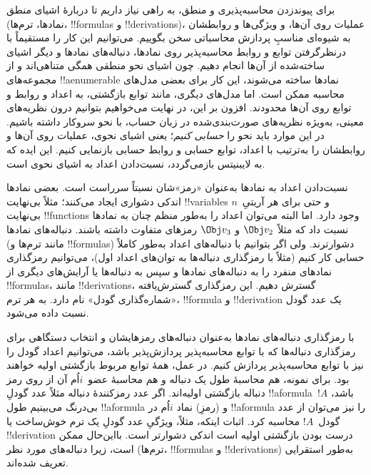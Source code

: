 \documentclass[../../../include/open-logic-section]{subfiles}
\begin{document}

برای پیوندزدن محاسبه‌پذیری و منطق، به راهی نیاز داریم تا دربارهٔ اشیای
منطق (نمادها، ترم‌ها، !!{formula}s و !!{derivation}s)، عملیات روی آن‌ها،
و ویژگی‌ها و روابطشان به شیوه‌ای مناسبِ پردازش محاسباتی سخن بگوییم.
می‌توانیم این کار را مستقیماً با درنظرگرفتن توابع و روابط محاسبه‌پذیر
روی نمادها، دنباله‌های نمادها و دیگر اشیای ساخته‌شده از آن‌ها انجام
دهیم. چون اشیای نحو منطقی همگی متناهی‌اند و از مجموعه‌های
!!a{enumerable} نمادها ساخته می‌شوند، این کار برای بعضی مدل‌های محاسبه
ممکن است. اما مدل‌های دیگری، مانند توابع بازگشتی، به اعداد و روابط و
توابع روی آن‌ها محدودند. افزون بر این، در نهایت می‌خواهیم بتوانیم
درون نظریه‌های معینی، به‌ویژه نظریه‌های صورت‌بندی‌شده در زبان حساب،
با نحو سروکار داشته باشیم. در این موارد باید نحو را \emph{حسابی
کنیم}؛ یعنی اشیای نحوی، عملیات روی آن‌ها و روابطشان را به‌ترتیب با
اعداد، توابع حسابی و روابط حسابی بازنمایی کنیم. این ایده که به
لایبنیتس بازمی‌گردد، نسبت‌دادن اعداد به اشیای نحوی است.

نسبت‌دادن اعداد به نمادها به‌عنوان «رمز»شان نسبتاً سرراست است. بعضی
نمادها اندکی دشواری ایجاد می‌کنند؛ مثلاً بی‌نهایت !!{variable}s و حتی
برای هر آریتیِ~$n$ بی‌نهایت !!{function}s وجود دارد. اما البته می‌توان
اعداد را به‌طور منظم چنان به نمادها نسبت داد که مثلاً $\Obj v_2$ و
$\Obj v_3$ رمزهای متفاوت داشته باشند. دنباله‌های نمادها (مانند ترم‌ها
و !!{formula}s) دشوارترند. ولی اگر بتوانیم با دنباله‌های اعداد به‌طور
کاملاً حسابی کار کنیم (مثلاً با رمزگذاری دنباله‌ها به توان‌های اعداد
اول)، می‌توانیم رمزگذاری نمادهای منفرد را به دنباله‌های نمادها و سپس
به دنباله‌ها یا آرایش‌های دیگری از !!{formula}s، مانند !!{derivation}s،
گسترش دهیم. این رمزگذاری گسترش‌یافته «شماره‌گذاری گودل» نام دارد. به
هر ترم، !!{formula} و !!{derivation} یک عدد گودل نسبت داده می‌شود.

با رمزگذاری دنباله‌های نمادها به‌عنوان دنباله‌های رمزهایشان و انتخاب
دستگاهی برای رمزگذاری دنباله‌ها که با توابع محاسبه‌پذیر پردازش‌پذیر
باشد، می‌توانیم اعداد گودل را نیز با توابع محاسبه‌پذیر پردازش کنیم.
در عمل، همهٔ توابع مربوط بازگشتی اولیه خواهند بود. برای نمونه، هم
محاسبهٔ طول یک دنباله و هم محاسبهٔ عضو~$i$اُم آن از روی رمز دنباله
بازگشتی اولیه‌اند. اگر عدد رمزکنندهٔ دنباله مثلاً عدد گودلِ
!!a{formula}~$!A$ باشد، بی‌درنگ می‌بینیم طول !!a{formula} و (رمزِ) نماد
$i$اُم در !!a{formula} را نیز می‌توان از عدد گودل~$!A$ محاسبه کرد. اثبات اینکه،
مثلاً، ویژگیِ عدد گودلِ یک ترم خوش‌ساخت یا !!{derivation} درست بودن
بازگشتی اولیه است اندکی دشوارتر است. بااین‌حال ممکن است، زیرا
دنباله‌های مورد نظر (ترم‌ها، !!{formula}s و !!{derivation}s) به‌طور
استقرایی تعریف شده‌اند.
\end{document}
